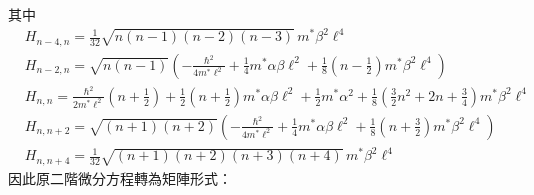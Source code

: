 \documentclass[12pt]{article}
\begin{document}
其中
\begin{align}
    &H_{n-4,n} = \frac{1}{32}\sqrt{n(n-1)(n-2)(n-3)}\, m^* \beta^2 \ell^4 \\
    &H_{n-2,n} = \sqrt{n(n-1)} \left( -\frac{\hbar^2}{4m^* \ell^2} + \frac{1}{4} m^* \alpha \beta \ell^2 + \frac{1}{8}\left(n - \frac{1}{2}\right) m^* \beta^2 \ell^4 \right) \\
    &H_{n,n} = \frac{\hbar^2}{2m^* \ell^2}\left(n + \frac{1}{2}\right) + \frac{1}{2}\left(n + \frac{1}{2}\right) m^* \alpha \beta \ell^2 + \frac{1}{2} m^* \alpha^2 + \frac{1}{8}\left(\frac{3}{2}n^2 + 2n + \frac{3}{4}\right) m^* \beta^2 \ell^4 \\
    &H_{n,n+2} = \sqrt{(n+1)(n+2)} \left( -\frac{\hbar^2}{4m^* \ell^2} + \frac{1}{4} m^* \alpha \beta \ell^2 + \frac{1}{8}\left(n + \frac{3}{2}\right) m^* \beta^2 \ell^4 \right) \\
    &H_{n,n+4} = \frac{1}{32}\sqrt{(n+1)(n+2)(n+3)(n+4)}\, m^* \beta^2 \ell^4
\end{align}
因此原二階微分方程轉為矩陣形式：
\end{document}

